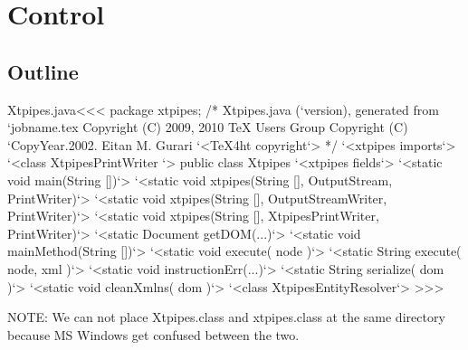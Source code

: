 \documentclass{article}
\begin{document}
{%
\section{Control}


\subsection{Outline}





 {}{
}


 {
    \def\BIN{}
}{
    \def\BIN{(/home/4/gurari/xtpipes.dir)}
}

% 
\expandafter\AddFile{}


\<Xtpipes.java\><<<
package xtpipes;
/* Xtpipes.java (`version), generated from `jobname.tex
   Copyright (C) 2009, 2010 TeX Users Group
   Copyright (C) `CopyYear.2002. Eitan M. Gurari
`<TeX4ht copyright`> */
`<xtpipes imports`>
`<class XtpipesPrintWriter  `>
public class Xtpipes {
   `<xtpipes fields`>
   `<static void main(String [])`>
   `<static void xtpipes(String [], OutputStream, PrintWriter)`>
   `<static void xtpipes(String [], OutputStreamWriter, PrintWriter)`>
   `<static void xtpipes(String [], XtpipesPrintWriter, PrintWriter)`>
   `<static Document getDOM(...)`>
   `<static void mainMethod(String [])`>
   `<static void execute( node )`>
   `<static String execute( node, xml )`>
   `<static void instructionErr(...)`>
   `<static String serialize( dom )`>
   `<static void cleanXmlns( dom )`>
}
`<class XtpipesEntityResolver`>
>>>


NOTE: We can not place Xtpipes.class and xtpipes.class at the same
directory because MS Windows get confused between the two.


}
\end{document}
